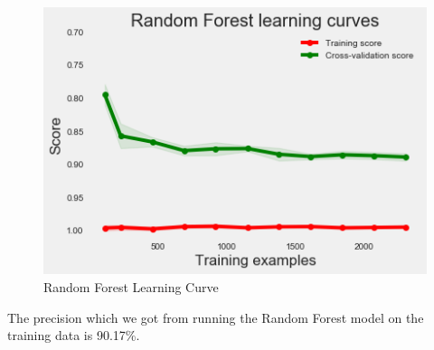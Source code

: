 \begin{figure}[H]
\caption{Random Forest Learning Curve}
\label{5.3}
\centering
\includegraphics[width=\columnwidth]{images/5_3.png}
\end{figure}

The precision which we got from running the Random Forest model on the training data is 90.17\%.



